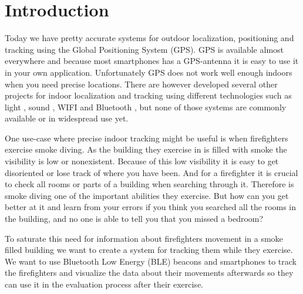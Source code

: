 \documentclass[../Main/thesis.tex]{subfiles}
\begin{document}
\chapter{Introduction}
\label{ch:introduction}


Today we have pretty accurate systems for outdoor localization, positioning and tracking using the Global Positioning System (GPS). 
GPS is available almost everywhere and because most smartphones has a GPS-antenna it is easy to use it in your own application. %
Unfortunately GPS does not work well enough indoors when you need precise locations.
There are however developed several other projects for indoor localization and tracking using different technologies such as light \citep{xiaohan2010improved}, sound \citep{schweinzer2010ultrasonic}, WIFI  \citep{chang2010robust} and Bluetooth \citep{Takahashi2016}, but none of those systems are commonly available or in widespread use yet.

One use-case where precise indoor tracking might be useful is when firefighters exercise smoke diving. 
As the building they exercise in is filled with smoke the visibility is low or nonexistent.
Because of this low visibility it is easy to get disoriented or lose track of where you have been.
And for a firefighter it is crucial to check all rooms or parts of a building when searching through it.
Therefore is smoke diving one of the important abilities they exercise.
But how can you get better at it and learn from your errors if you think you searched all the rooms in the building, and no one is able to tell you that you missed a bedroom?

To saturate this need for information about firefighters movement in a smoke filled building we want to create a system for tracking them while they exercise.
We want to use Bluetooth Low Energy (BLE) beacons and smartphones to track the firefighters and visualize the data about their movements afterwards so they can use it in the evaluation process after their exercise.
\end{document}
